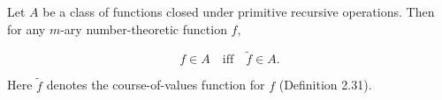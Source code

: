 Let $A$ be a class of functions closed under primitive recursive operations. Then for any $m$-ary number-theoretic function $f$,

$$f \in A \quad \text{iff} \quad \tilde{f} \in A.$$

Here $\tilde{f}$ denotes the course-of-values function for $f$ (Definition 2.31).
